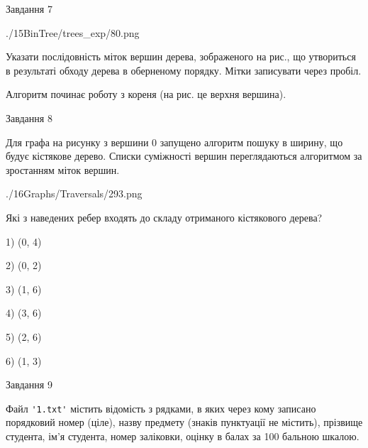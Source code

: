 \documentclass[12pt, ukrainian]{article}
\def\code#1{\Verb!#1!}
\begin{document}
{\vspace{10mm}\par

\newpage
\begin{minipage}[t]{9.7cm}
               
{\begin{center}Завдання {7}\end{center}}
\vspace{-6mm}

\begin{center}
	{./15BinTree/trees_exp/80.png}
\end{center}
Указати послідовність міток вершин дерева, зображеного на рис., що утвориться в результаті обходу дерева в оберненому порядку. Мітки записувати через пробіл.\par Алгоритм починає роботу з кореня (на рис. це верхня вершина).\par

\end{minipage}
\vline \hspace{8mm}
\begin{minipage}[t]{8.0cm}
               
{\begin{center}Завдання {8}\end{center}}
\vspace{-6mm}
Для графа на рисунку з вершини 0 запущено алгоритм пошуку в ширину, що будує кістякове дерево. Списки суміжності вершин переглядаються алгоритмом за зростанням міток вершин.\par
\begin{center}
	{./16Graphs/Traversals/293.png}
\end{center}
\par Які з наведених ребер входять до складу отриманого кістякового дерева?\par
1) (0, 4)\par
2) (0, 2)\par
3) (1, 6)\par
4) (3, 6)\par
5) (2, 6)\par
6) (1, 3)\par
{\vskip 15pt} \par

\end{minipage}

               
{\begin{center}Завдання {9}\end{center}}
\vspace{-6mm}
Файл \code{'1.txt'} містить відомість з рядками, в яких через кому записано поряд\-ковий номер (ціле), назву предмету (знаків пунктуації не містить), прізвище студента, ім'я студента, номер заліковки, оцінку в балах за 100 бальною шкалою.

}
\end{document}
